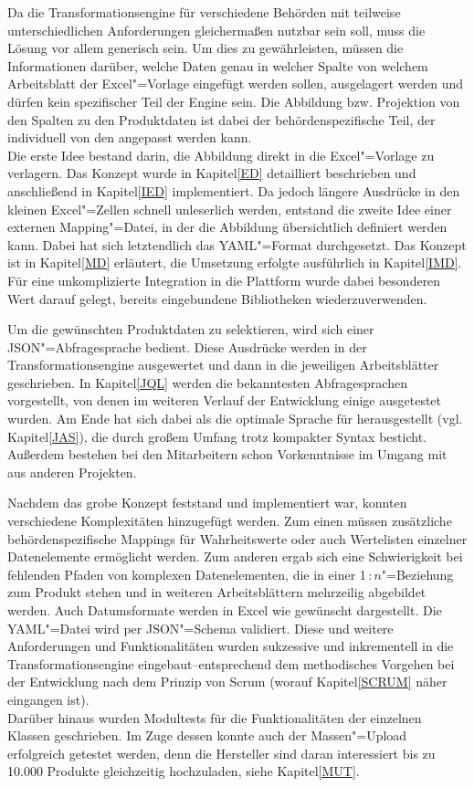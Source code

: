 Da die Transformationsengine für verschiedene Behörden mit teilweise unterschiedlichen Anforderungen gleichermaßen nutzbar sein soll, muss die Lösung vor allem generisch sein. Um dies zu gewährleisten, müssen die Informationen darüber, welche Daten genau in welcher Spalte von welchem Arbeitsblatt der Excel"=Vorlage eingefügt werden sollen, ausgelagert werden und dürfen kein spezifischer Teil der Engine sein. Die Abbildung bzw. Projektion von den Spalten zu den Produktdaten ist dabei der behördenspezifische Teil, der individuell von den  angepasst werden kann. \\
Die erste Idee bestand darin, die Abbildung direkt in die Excel"=Vorlage zu verlagern. Das Konzept wurde in Kapitel\nbs\ref{ED} detailliert beschrieben und anschließend in Kapitel\nbs\ref{IED} implementiert. Da jedoch längere Ausdrücke in den kleinen Excel"=Zellen schnell unleserlich werden, entstand die zweite Idee einer externen Mapping"=Datei, in der die Abbildung übersichtlich definiert werden kann. Dabei hat sich letztendlich das YAML"=Format durchgesetzt. Das Konzept ist in Kapitel\nbs\ref{MD} erläutert, die Umsetzung erfolgte ausführlich in Kapitel\nbs\ref{IMD}. Für eine unkomplizierte Integration in die Plattform wurde dabei besonderen Wert darauf gelegt, bereits eingebundene Bibliotheken wiederzuverwenden. 

Um die gewünschten Produktdaten zu selektieren, wird sich einer JSON"=Abfragesprache bedient. Diese Ausdrücke werden in der Transformationsengine ausgewertet und dann in die jeweiligen Arbeitsblätter geschrieben. In Kapitel\nbs\ref{JQL} werden die bekanntesten Abfragesprachen vorgestellt, von denen im weiteren Verlauf der Entwicklung einige ausgetestet wurden. Am Ende hat sich dabei  als die optimale Sprache für  herausgestellt (vgl. Kapitel\nbs\ref{JAS}), die durch großem Umfang trotz kompakter Syntax besticht. Außerdem bestehen bei den Mitarbeitern schon Vorkenntnisse im Umgang mit  aus anderen Projekten.

Nachdem das grobe Konzept feststand und implementiert war, konnten verschiedene Komplexitäten hinzugefügt werden. Zum einen müssen zusätzliche behördenspezifische Mappings für Wahrheitswerte oder auch Wertelisten einzelner Datenelemente ermöglicht werden. Zum anderen ergab sich eine Schwierigkeit bei fehlenden Pfaden von komplexen Datenelementen, die in einer 1\,:\,$n$"=Beziehung zum Produkt stehen und in weiteren Arbeitsblättern mehrzeilig abgebildet werden. Auch Datumsformate werden in Excel wie gewünscht dargestellt. Die YAML"=Datei wird per JSON"=Schema validiert. Diese und weitere Anforderungen und Funktionalitäten wurden sukzessive und inkrementell in die Transformationsengine eingebaut\nbs --\nbs entsprechend dem methodisches Vorgehen bei der Entwicklung nach dem Prinzip von Scrum (worauf Kapitel\nbs\ref{SCRUM} näher eingangen ist).\\
Darüber hinaus wurden Modultests für die Funktionalitäten der einzelnen Klassen geschrieben. Im Zuge dessen konnte auch der Massen"=Upload erfolgreich getestet werden, denn die Hersteller sind daran interessiert bis zu 10.000 Produkte gleichzeitig hochzuladen, siehe Kapitel\nbs\ref{MUT}. 

